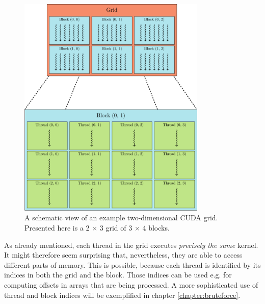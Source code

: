 \begin{figure}[ht]
    \centering
    \includegraphics[width=0.8\textwidth]{figures/cuda_grid}
    \caption{A schematic view of an example two-dimensional CUDA grid. Presented here is a 2 $\times$ 3 grid of 3 $\times$ 4 blocks.}
    \label{fig:cuda_grid}
\end{figure}

As already mentioned, each thread in the grid executes \emph{precisely the same} kernel. It might therefore seem surprising that, nevertheless, they are able to access different parts of memory. This is possible, because each thread is identified by its indices in both the grid and the block. Those indices can be used e.g. for computing offsets in arrays that are being processed. A more sophisticated use of thread and block indices will be exemplified in chapter \ref{chapter:bruteforce}.


